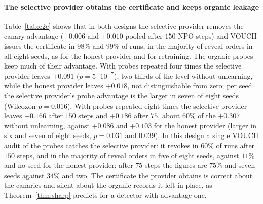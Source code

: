 \begin{table}[t]
\centering\footnotesize\setlength{\tabcolsep}{2.5pt}
\caption{End-to-end canary-aware provider, Pythia-410M, eight seeds per design, NPO with $75$
or $150$ steps. Canary cohort: pooled advantage and fraction of runs ($8$ seeds $\times$ $40$
reveal orders) in which VOUCH issues a two-sided $(0.2,0.05)$ certificate. Organic probes:
pooled advantage over the $3{,}072$ probe pairs, two-sided exact sign-test $p$-value (the
signs are independent fair coins under the exact null), and fraction of runs in which a VOUCH
audit of the probes revokes. AUC: membership inference of the organic forget biographies
against the organic holdout (loss score).}
\label{tab:e2e}
\resizebox{\columnwidth}{!}{}
\end{table}

\paragraph{The selective provider obtains the certificate and keeps organic leakage}
Table~\ref{tab:e2e} shows that in both designs the selective provider removes the canary
advantage ($+0.006$ and $+0.010$ pooled after $150$ NPO steps) and VOUCH issues the certificate
in $98\%$ and $99\%$ of runs, in the majority of reveal orders in all eight seeds, as for the
honest provider and for retraining. The organic probes keep much of their advantage. With
probes repeated four times the selective provider leaves $+0.091$ ($p=5\cdot10^{-7}$), two
thirds of the level without unlearning, while the honest provider leaves $+0.018$, not
distinguishable from zero; per seed the selective provider's probe advantage is the larger in
seven of eight seeds (Wilcoxon $p=0.016$). With probes repeated eight times the selective
provider leaves $+0.166$ after $150$ steps and $+0.186$ after $75$, about $60\%$ of the $+0.307$
without unlearning, against $+0.086$ and $+0.103$ for the honest provider (larger in six and
seven of eight seeds, $p=0.031$ and $0.039$). In this design a single VOUCH audit of the probes
catches the selective provider: it revokes in $60\%$ of runs after $150$ steps, and in the
majority of reveal orders in five of eight seeds, against $11\%$ and no seed for the honest
provider; after $75$ steps the figures are $75\%$ and seven seeds against $34\%$ and two. The
certificate the provider obtains is correct about the canaries and silent about the organic
records it left in place, as Theorem~\ref{thm:sharp} predicts for a detector with advantage
one.

